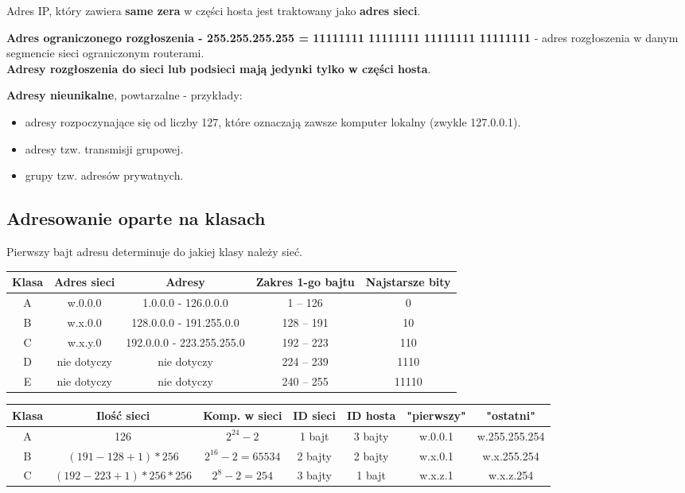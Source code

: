 \documentclass[../main.tex]{subfiles}
\begin{document}
    Adres IP, który zawiera \textbf{same zera} w części hosta jest traktowany jako \textbf{adres sieci}.

    \textbf{Adres ograniczonego rozgłoszenia - 255.255.255.255 = 11111111 11111111 11111111 11111111} -  adres rozgłoszenia
    w danym segmencie sieci ograniczonym routerami.\\
    \textbf{Adresy rozgłoszenia do sieci lub podsieci mają jedynki tylko w części hosta}.

    \textbf{Adresy nieunikalne}, powtarzalne - przykłady:
    \begin{itemize}
        \item adresy rozpoczynające się od liczby 127, które oznaczają zawsze komputer lokalny (zwykle 127.0.0.1).
        \item adresy tzw. transmisji grupowej.
        \item grupy tzw. adresów prywatnych.
    \end{itemize}

    \subsection{Adresowanie oparte na klasach}

    Pierwszy bajt adresu determinuje do jakiej klasy należy sieć.

    \begin{tabular}{|c|c|c|c|c|}
        \hline
        Klasa & Adres sieci & Adresy & Zakres 1-go bajtu & Najstarsze bity\\
        \hline
        A & w.0.0.0 & 1.0.0.0 - 126.0.0.0 & 1 – 126 & 0\\
        \hline
        B & w.x.0.0 & 128.0.0.0 - 191.255.0.0 & 128 – 191 & 10\\
        \hline
        C & w.x.y.0 & 192.0.0.0 - 223.255.255.0 & 192 – 223 & 110\\
        \hline
        D & nie dotyczy & nie dotyczy & 224 – 239 & 1110\\
        \hline
        E & nie dotyczy & nie dotyczy & 240 – 255 & 11110\\
        \hline
    \end{tabular}


    \begin{tabular}{|c|c|c|c|c|c|c|}
        \hline
        Klasa & Ilość sieci & Komp. w sieci & ID sieci & ID hosta & "pierwszy" & "ostatni"\\
        \hline
        A & 126 & $2^{24}-2$ & 1 bajt & 3 bajty & w.0.0.1 & w.255.255.254\\
        \hline
        B & $(191-128+1)*256$ & $2^{16}-2 = 65 534$ & 2 bajty & 2 bajty & w.x.0.1 & w.x.255.254\\
        \hline
        C & $(192-223+1)*256*256$ & $2^8 -2 = 254$ & 3 bajty & 1 bajt & w.x.z.1 & w.x.z.254\\
        \hline
    \end{tabular}
\end{document}
